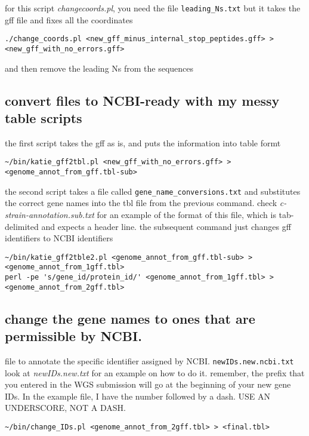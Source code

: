 \documentclass[11pt]{article}
\begin{document}
for this script \emph{changecoords.pl}, you need the file \texttt{leading\_Ns.txt}
but it takes the gff file and fixes all the coordinates

\begin{verbatim}
./change_coords.pl <new_gff_minus_internal_stop_peptides.gff> > <new_gff_with_no_errors.gff>
\end{verbatim}


and then remove the leading Ns from the sequences
\subsection*{convert files to NCBI-ready with my messy table scripts}
\label{sec-3.4}


the first script takes the gff as is, and puts the information into table formt

\begin{verbatim}
~/bin/katie_gff2tbl.pl <new_gff_with_no_errors.gff> > <genome_annot_from_gff.tbl-sub>
\end{verbatim}


the second script takes a file called \texttt{gene\_name\_conversions.txt} and substitutes the correct gene names into the tbl file from the previous command.
check \emph{c-strain-annotation.sub.txt} for an example of the format of this file, which is tab-delimited and expects a header line.
the subsequent command just changes gff identifiers to NCBI identifiers

\begin{verbatim}
~/bin/katie_gff2tble2.pl <genome_annot_from_gff.tbl-sub> > <genome_annot_from_1gff.tbl>
perl -pe 's/gene_id/protein_id/' <genome_annot_from_1gff.tbl> > <genome_annot_from_2gff.tbl>
\end{verbatim}


\subsection*{change the gene names to ones that are permissible by NCBI.}
\label{sec-3.5}

file to annotate the specific identifier assigned by NCBI. \texttt{newIDs.new.ncbi.txt}
look at \emph{newIDs.new.txt} for an example on how to do it. remember, the prefix that 
you entered in the WGS submission will go at the beginning of your new gene IDs. In the 
example file, I have the number followed by a dash. USE AN UNDERSCORE, NOT A DASH.

\begin{verbatim}
~/bin/change_IDs.pl <genome_annot_from_2gff.tbl> > <final.tbl>
\end{verbatim}
\end{document}
